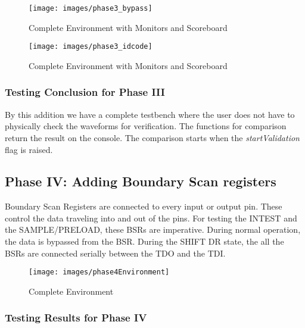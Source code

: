 \documentclass[a4paper,11pt]{article}
\begin{document}
\begin{figure}[ht]
\centering
\texttt{[image: images/phase3\_bypass]}
\caption{Complete Environment with Monitors and Scoreboard}
\end{figure}


\begin{figure}[ht]
\centering
\texttt{[image: images/phase3\_idcode]}
\caption{Complete Environment with Monitors and Scoreboard}
\end{figure}


\subsubsection{Testing Conclusion for Phase III}

By this addition we have a complete testbench where the user does not have to physically check the waveforms for verification. The functions for comparison return the result on the console. The comparison starts when the \textit{startValidation} flag is raised.


\FloatBarrier
\subsection{Phase IV: Adding Boundary Scan registers}
Boundary Scan Registers are connected to every input or output pin. These control the data traveling into and out of the pins. For testing the INTEST and the SAMPLE/PRELOAD, these BSRs are imperative. During normal operation, the data is bypassed from the BSR. During the SHIFT DR state, the all the BSRs are connected serially between the TDO and the TDI.

\begin{figure}[ht]
\centering
\texttt{[image: images/phase4Environment]}
\caption{Complete Environment }
\end{figure}

\subsubsection{Testing Results for Phase IV}
\end{document}
